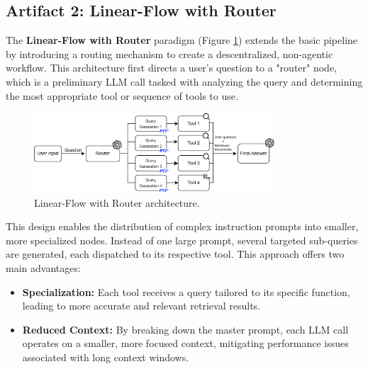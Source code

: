 

    \subsection{Artifact 2: Linear-Flow with Router}
    
        The \textbf{Linear-Flow with Router} paradigm (Figure \ref{fig:diagrama_linear_w_router}) extends the basic pipeline by introducing a routing mechanism to create a descentralized, non-agentic workflow. This architecture first directs a user's question to a "router" node, which is a preliminary LLM call tasked with analyzing the query and determining the most appropriate tool or sequence of tools to use.

        \begin{figure}[h]
            \centering
            \includegraphics[width=0.8\textwidth]{images_exp2/diagrams/diagrama_linear_w_router.png}
            \caption{Linear-Flow with Router architecture.}
            \label{fig:diagrama_linear_w_router}
        \end{figure}

        This design enables the distribution of complex instruction prompts into smaller, more specialized nodes. Instead of one large prompt, several targeted sub-queries are generated, each dispatched to its respective tool. This approach offers two main advantages:

        \begin{itemize}
            \item \textbf{Specialization:} Each tool receives a query tailored to its specific function, leading to more accurate and relevant retrieval results.
            \item \textbf{Reduced Context:} By breaking down the master prompt, each LLM call operates on a smaller, more focused context, mitigating performance issues associated with long context windows.
        \end{itemize}


